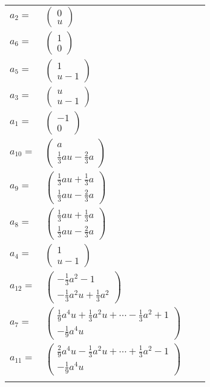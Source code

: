 \documentclass[1p]{elsarticle_modified}
\theoremstyle{definition}
\begin{document}
\begin{tabular}{m{7pt} m{180pt} m{7pt} m{180pt} }
\flushright $a_{2}=$&$\begin{pmatrix}0\\u\end{pmatrix}$ \\
\flushright $a_{6}=$&$\begin{pmatrix}1\\0\end{pmatrix}$ \\
\flushright $a_{5}=$&$\begin{pmatrix}1\\u-1\end{pmatrix}$ \\
\flushright $a_{3}=$&$\begin{pmatrix}u\\u-1\end{pmatrix}$ \\
\flushright $a_{1}=$&$\begin{pmatrix}-1\\0\end{pmatrix}$ \\
\flushright $a_{10}=$&$\begin{pmatrix}a\\\frac{1}{3} a u-\frac{2}{3} a\end{pmatrix}$ \\
\flushright $a_{9}=$&$\begin{pmatrix}\frac{1}{3} a u+\frac{1}{3} a\\\frac{1}{3} a u-\frac{2}{3} a\end{pmatrix}$ \\
\flushright $a_{8}=$&$\begin{pmatrix}\frac{1}{3} a u+\frac{1}{3} a\\\frac{1}{3} a u-\frac{2}{3} a\end{pmatrix}$ \\
\flushright $a_{4}=$&$\begin{pmatrix}1\\u-1\end{pmatrix}$ \\
\flushright $a_{12}=$&$\begin{pmatrix}-\frac{1}{3} a^2-1\\-\frac{1}{3} a^2 u+\frac{1}{3} a^2\end{pmatrix}$ \\
\flushright $a_{7}=$&$\begin{pmatrix}\frac{1}{9} a^4 u+\frac{1}{3} a^2 u+\cdots-\frac{1}{3} a^2+1\\-\frac{1}{9} a^4 u\end{pmatrix}$ \\
\flushright $a_{11}=$&$\begin{pmatrix}\frac{2}{9} a^4 u-\frac{1}{3} a^2 u+\cdots+\frac{1}{3} a^2-1\\-\frac{1}{9} a^4 u\end{pmatrix}$\\&\end{tabular}
\end{document}
